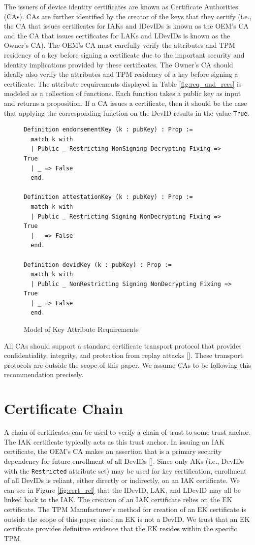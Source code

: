 The issuers of device identity certificates are known as Certificate Authorities (CAs). CAs are further identified by the creator of the keys that they certify (i.e., the CA that issues certificates for IAKs and IDevIDs is known as the OEM's CA and the CA that issues certificates for LAKs and LDevIDs is known as the Owner's CA). The OEM's CA must carefully verify the attributes and TPM residency of a key before signing a certificate due to the important security and identity implications provided by these certificates. The Owner's CA should ideally also verify the attributes and TPM residency of a key before signing a certificate. The attribute requirements displayed in Table \ref{fig:req_and_recs} is modeled as a collection of functions. Each function takes a public key as input and returns a proposition. If a CA issues a certificate, then it should be the case that applying the corresponding function on the DevID results in the value \verb|True|.
\begin{figure}[h]
\begin{lstlisting}[language=Coq]
Definition endorsementKey (k : pubKey) : Prop :=
  match k with
  | Public _ Restricting NonSigning Decrypting Fixing => True
  | _ => False
  end.

Definition attestationKey (k : pubKey) : Prop :=
  match k with
  | Public _ Restricting Signing NonDecrypting Fixing => True
  | _ => False
  end.

Definition devidKey (k : pubKey) : Prop :=
  match k with
  | Public _ NonRestricting Signing NonDecrypting Fixing => True
  | _ => False
  end.
\end{lstlisting}
\caption{Model of Key Attribute Requirements}
\end{figure}
All CAs should support a standard certificate transport protocol that provides confidentiality, integrity, and protection from replay attacks [\cite{DevIDSpec-TCG}]. These transport protocols are outside the scope of this paper. We assume CAs to be following this recommendation precisely. 




\section{Certificate Chain}

A chain of certificates can be used to verify a chain of trust to some trust anchor. The IAK certificate typically acts as this trust anchor. In issuing an IAK certificate, the OEM's CA makes an assertion that is a primary security dependency for future enrollment of all DevIDs [\cite{DevIDSpec-TCG}]. Since only AKs (i.e., DevIDs with the \verb|Restricted| attribute set) may be used for key certification, enrollment of all DevIDs is reliant, either directly or indirectly, on an IAK certificate. We can see in Figure \ref{fig:cert_rel} that the IDevID, LAK, and LDevID may all be linked back to the IAK. The creation of an IAK certificate relies on the EK certificate. The TPM Manufacturer's method for creation of an EK certificate is outside the scope of this paper since an EK is not a DevID. We trust that an EK certificate provides definitive evidence that the EK resides within the specific TPM.

